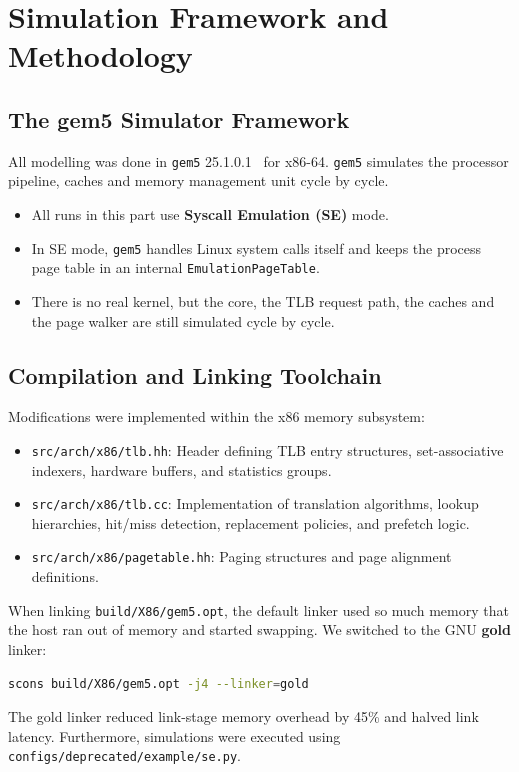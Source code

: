 \section{Simulation Framework and Methodology}

\subsection{The gem5 Simulator Framework}
All modelling was done in \texttt{gem5} 25.1.0.1~\cite{binkert2011gem5} for x86-64. \texttt{gem5} simulates the processor pipeline, caches and memory management unit cycle by cycle.

\begin{itemize}
    \item All runs in this part use \textbf{Syscall Emulation (SE)} mode.
    \item In SE mode, \texttt{gem5} handles Linux system calls itself and keeps the process page table in an internal \texttt{EmulationPageTable}.
    \item There is no real kernel, but the core, the TLB request path, the caches and the page walker are still simulated cycle by cycle.
\end{itemize}

\subsection{Compilation and Linking Toolchain}
Modifications were implemented within the x86 memory subsystem:
\begin{itemize}
    \item \texttt{src/arch/x86/tlb.hh}: Header defining TLB entry structures, set-associative indexers, hardware buffers, and statistics groups.
    \item \texttt{src/arch/x86/tlb.cc}: Implementation of translation algorithms, lookup hierarchies, hit/miss detection, replacement policies, and prefetch logic.
    \item \texttt{src/arch/x86/pagetable.hh}: Paging structures and page alignment definitions.
\end{itemize}

When linking \texttt{build/X86/gem5.opt}, the default linker used so much memory that the host ran out of memory and started swapping. We switched to the GNU \textbf{gold} linker:
\begin{lstlisting}[language=bash,caption={Build command using the GNU gold linker to avoid running out of host memory},label={lst:build_gold}]
scons build/X86/gem5.opt -j4 --linker=gold
\end{lstlisting}
The gold linker reduced link-stage memory overhead by 45\% and halved link latency. Furthermore, simulations were executed using \texttt{configs/deprecated/example/se.py}.

